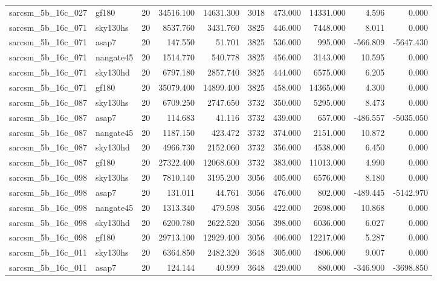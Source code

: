 \begin{tabular}{llrrrrrrrr}
sarcsm\_5b\_16c\_027 & gf180 & 20 & 34516.100 & 14631.300 & 3018 & 473.000 & 14331.000 & 4.596 & 0.000 \\
sarcsm\_5b\_16c\_071 & sky130hs & 20 & 8537.760 & 3431.760 & 3825 & 446.000 & 7448.000 & 8.011 & 0.000 \\
sarcsm\_5b\_16c\_071 & asap7 & 20 & 147.550 & 51.701 & 3825 & 536.000 & 995.000 & -566.809 & -5647.430 \\
sarcsm\_5b\_16c\_071 & nangate45 & 20 & 1514.770 & 540.778 & 3825 & 456.000 & 3143.000 & 10.595 & 0.000 \\
sarcsm\_5b\_16c\_071 & sky130hd & 20 & 6797.180 & 2857.740 & 3825 & 444.000 & 6575.000 & 6.205 & 0.000 \\
sarcsm\_5b\_16c\_071 & gf180 & 20 & 35079.400 & 14899.400 & 3825 & 458.000 & 14365.000 & 4.300 & 0.000 \\
sarcsm\_5b\_16c\_087 & sky130hs & 20 & 6709.250 & 2747.650 & 3732 & 350.000 & 5295.000 & 8.473 & 0.000 \\
sarcsm\_5b\_16c\_087 & asap7 & 20 & 114.683 & 41.116 & 3732 & 439.000 & 657.000 & -486.557 & -5035.050 \\
sarcsm\_5b\_16c\_087 & nangate45 & 20 & 1187.150 & 423.472 & 3732 & 374.000 & 2151.000 & 10.872 & 0.000 \\
sarcsm\_5b\_16c\_087 & sky130hd & 20 & 4966.730 & 2152.060 & 3732 & 356.000 & 4538.000 & 6.450 & 0.000 \\
sarcsm\_5b\_16c\_087 & gf180 & 20 & 27322.400 & 12068.600 & 3732 & 383.000 & 11013.000 & 4.990 & 0.000 \\
sarcsm\_5b\_16c\_098 & sky130hs & 20 & 7810.140 & 3195.200 & 3056 & 405.000 & 6576.000 & 8.180 & 0.000 \\
sarcsm\_5b\_16c\_098 & asap7 & 20 & 131.011 & 44.761 & 3056 & 476.000 & 802.000 & -489.445 & -5142.970 \\
sarcsm\_5b\_16c\_098 & nangate45 & 20 & 1313.340 & 479.598 & 3056 & 422.000 & 2698.000 & 10.868 & 0.000 \\
sarcsm\_5b\_16c\_098 & sky130hd & 20 & 6200.780 & 2622.520 & 3056 & 398.000 & 6036.000 & 6.027 & 0.000 \\
sarcsm\_5b\_16c\_098 & gf180 & 20 & 29713.100 & 12929.400 & 3056 & 406.000 & 12217.000 & 5.287 & 0.000 \\
sarcsm\_5b\_16c\_011 & sky130hs & 20 & 6364.850 & 2482.320 & 3648 & 305.000 & 4806.000 & 9.007 & 0.000 \\
sarcsm\_5b\_16c\_011 & asap7 & 20 & 124.144 & 40.999 & 3648 & 429.000 & 880.000 & -346.900 & -3698.850 \\

\end{tabular}
